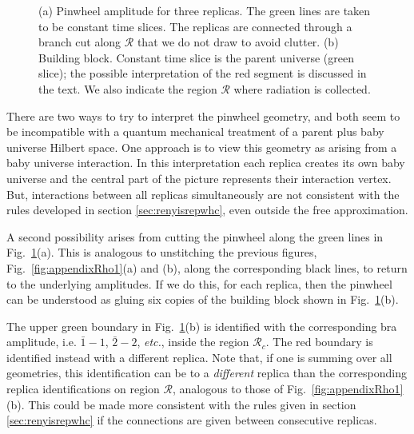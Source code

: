 \documentclass[12pt]{article}
\numberwithin{equation}{section}
\begin{document}
\begin{figure}[h!]
\begin{center}
 \caption{\label{fig:pinwheel} (a) Pinwheel amplitude for three replicas. The green lines are taken to be constant time slices. The replicas are connected through a branch cut along $\mathcal{R}$ that we do not draw to avoid clutter. (b) Building block. Constant time slice is the parent universe (green slice); the possible interpretation of the red segment is discussed in the text. We also indicate the region $\mathcal{R}$ where radiation is collected.}
\end{center}
\end{figure}

There are two ways to try to interpret the pinwheel geometry, and both seem to be incompatible with a quantum mechanical treatment of a parent plus baby universe Hilbert space. One approach is to view this geometry as arising from a baby universe interaction. In this interpretation each replica creates its own baby universe and the central part of the picture represents their interaction vertex. But, interactions between all replicas simultaneously are not consistent with the rules developed in section \ref{sec:renyisrepwhc}, even outside the free approximation.  

A second possibility arises from cutting the pinwheel along the green lines in Fig.~\ref{fig:pinwheel}(a).  This is analogous to unstitching the previous figures, Fig.~\ref{fig:appendixRho1}(a) and (b), along the corresponding black lines, to return to the underlying amplitudes.  If we do this, for each replica, 
then the pinwheel can be understood as gluing six copies of the building block shown in Fig.~\ref{fig:pinwheel}(b).

The upper green boundary in Fig.~\ref{fig:pinwheel}(b) is identified with the corresponding bra amplitude, i.e. $\bar{1}-1$, $\bar{2}-2$, {\it etc.}, inside the region $\mathcal{R}_c$. The red boundary is identified instead with a different replica. Note that, if one is summing over all geometries, this identification can be to a {\it different} replica than the corresponding replica identifications on region $\mathcal{R}$, analogous to those of Fig.~\ref{fig:appendixRho1}(b).  This could be made more consistent with the rules given in section \ref{sec:renyisrepwhc} if the connections are given between consecutive replicas. 
\end{document}
